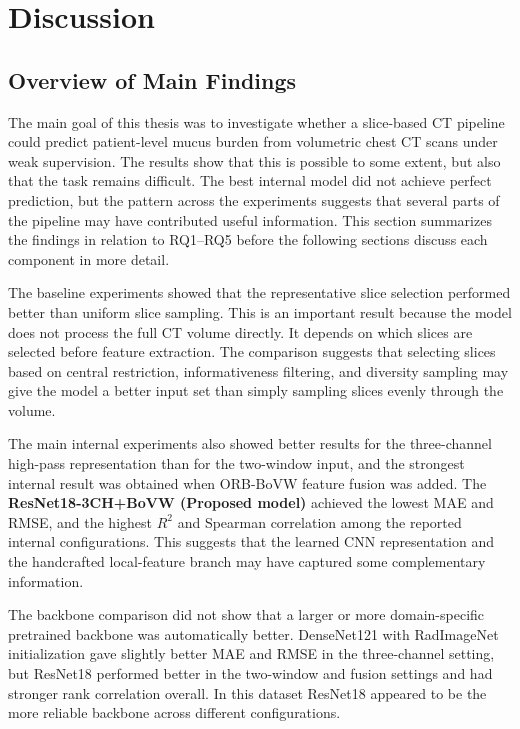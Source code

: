 \chapter{Discussion}


\section{Overview of Main Findings}
The main goal of this thesis was to investigate whether a slice-based CT pipeline could predict patient-level mucus burden from volumetric chest CT scans under weak supervision. The results show that this is possible to some extent, but also that the task remains difficult. The best internal model did not achieve perfect prediction, but the pattern across the experiments suggests that several parts of the pipeline may have contributed useful information. This section summarizes the findings in relation to RQ1--RQ5 before the following sections discuss each component in more detail.

The baseline experiments showed that the representative slice selection performed better than uniform slice sampling. This is an important result because the model does not process the full CT volume directly. It depends on which slices are selected before feature extraction. The comparison suggests that selecting slices based on central restriction, informativeness filtering, and diversity sampling may give the model a better input set than simply sampling slices evenly through the volume.

The main internal experiments also showed better results for the three-channel high-pass representation than for the two-window input, and the strongest internal result was obtained when ORB-BoVW feature fusion was added. The \textbf{ResNet18-3CH+BoVW (Proposed model)} achieved the lowest MAE and RMSE, and the highest \(R^2\) and Spearman correlation among the reported internal configurations. This suggests that the learned CNN representation and the handcrafted local-feature branch may have captured some complementary information.

The backbone comparison did not show that a larger or more domain-specific pretrained backbone was automatically better. DenseNet121 with RadImageNet initialization gave slightly better MAE and RMSE in the three-channel setting, but ResNet18 performed better in the two-window and fusion settings and had stronger rank correlation overall. In this dataset ResNet18 appeared to be the more reliable backbone across different configurations.

